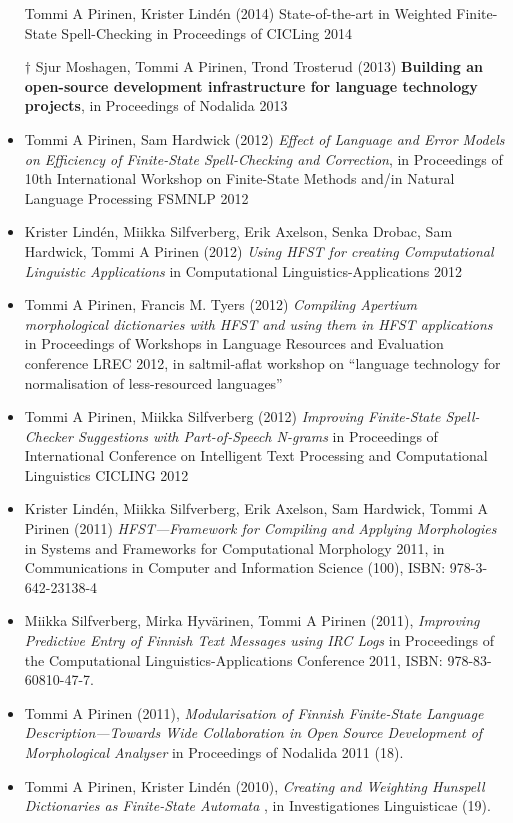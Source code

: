 \documentclass[a4paper]{article}
\begin{document}
\begin{itemize}
Tommi A Pirinen, Krister Lindén (2014) State-of-the-art in Weighted Finite-State Spell-Checking in Proceedings of CICLing 2014
\item[$\dagger$] Sjur Moshagen, Tommi A Pirinen, Trond Trosterud (2013) \textbf{Building an open-source development infrastructure for language technology projects}, in Proceedings of Nodalida 2013
\item Tommi A Pirinen, Sam Hardwick (2012) \textit{Effect of Language and Error Models on Efficiency of Finite-State Spell-Checking and Correction}, in Proceedings of 10th International Workshop on Finite-State Methods and/in Natural Language Processing FSMNLP 2012
\item Krister Lindén, Miikka Silfverberg, Erik Axelson, Senka Drobac, Sam Hardwick, Tommi A Pirinen (2012) \textit{Using HFST for creating Computational Linguistic Applications} in Computational Linguistics-Applications 2012
\item Tommi A Pirinen, Francis M. Tyers (2012) \textit{Compiling Apertium morphological dictionaries with HFST and using them in HFST applications} in Proceedings of Workshops in Language Resources and Evaluation conference LREC 2012, in saltmil-aflat workshop on “language technology for normalisation of less-resourced languages”
\item Tommi A Pirinen, Miikka Silfverberg (2012) \textit{Improving Finite-State Spell-Checker Suggestions with Part-of-Speech N-grams} in Proceedings of International Conference on Intelligent Text Processing and Computational Linguistics CICLING 2012
\item Krister Lindén, Miikka Silfverberg, Erik Axelson, Sam Hardwick, Tommi A Pirinen (2011) \textit{HFST—Framework for Compiling and Applying Morphologies} in Systems and Frameworks for Computational Morphology 2011, in Communications in Computer and Information Science (100), ISBN: 978-3-642-23138-4
\item Miikka Silfverberg, Mirka Hyvärinen, Tommi A Pirinen (2011), \textit{Improving Predictive Entry of Finnish Text Messages using IRC Logs} in Proceedings of the Computational Linguistics-Applications Conference 2011, ISBN: 978-83-60810-47-7.
\item Tommi A Pirinen (2011), \textit{Modularisation of Finnish Finite-State Language Descrip\-tion—Towards Wide Collaboration in Open Source Development of Morphological Analyser} in Proceedings of Nodalida 2011 (18).
\item Tommi A Pirinen, Krister Lindén (2010), \textit{Creating and Weighting Hunspell Dictionaries as Finite-State Automata} , in Investigationes Linguisticae (19).

\end{itemize}
\end{document}
